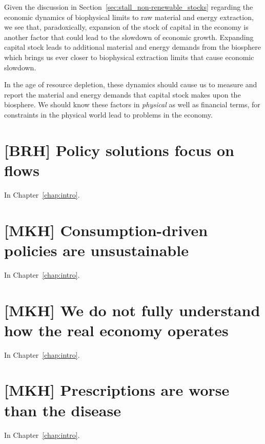 Given the discussion in Section~\ref{sec:stall_non-renewable_stocks}
regarding the economic dynamics 
of biophysical limits to raw material and energy extraction,
we see that, paradoxically, 
expansion of the stock of capital in the economy 
is another factor that could lead to the slowdown of economic growth.
Expanding capital stock leads to additional material and energy demands from the biosphere
which brings us ever closer to biophysical extraction limits 
that cause economic slowdown.

In the age of resource depletion, 
these dynamics should cause us to measure and report
the material and energy demands that capital stock 
makes upon the biosphere.
We should know these factors 
in \emph{physical} as well as financial terms,
for constraints in the physical world lead to problems in the economy.



\section{[BRH] Policy solutions focus on flows}
\label{sec:policy_flows}

In Chapter~\ref{chap:intro}.


\section{[MKH] Consumption-driven policies are unsustainable}
\label{sec:consumption_unsustainable}

In Chapter~\ref{chap:intro}.


\section{[MKH] We do not fully understand how the real economy operates}
\label{sec:dont_understand_real_economy}

In Chapter~\ref{chap:intro}.


\section{[MKH] Prescriptions are worse than the disease}
\label{sec:prescriptions_disease}

In Chapter~\ref{chap:intro}.


